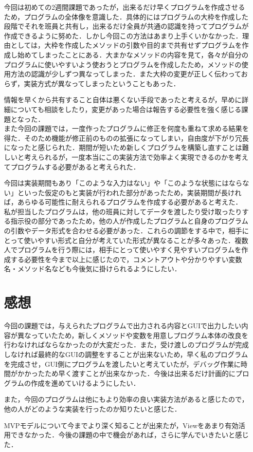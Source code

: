 \documentclass[12pt]{jarticle}
\begin{document}
今回は初めての2週間課題であったが，出来るだけ早くプログラムを作成させるため，プログラムの全体像を意識した．具体的にはプログラムの大枠を作成した段階でそれを班員と共有し，出来るだけ全員が共通の認識を持ってプログラムが作成できるように努めた．しかし今回この方法はあまり上手くいかなかった．理由としては，大枠を作成したメソッドの引数や目的まで共有せずプログラムを作成し始めてしまったことにある．大まかなメソッドの内容を見て，各々が自分のプログラムに使いやすいよう使おうとプログラムを作成したため，メソッドの使用方法の認識が少しずつ異なってしまった．また大枠の変更が正しく伝わっておらず，実装方式が異なってしまったということもあった．\par
情報を早くから共有すること自体は悪くない手段であったと考えるが，早めに詳細についても相談をしたり，変更があった場合は報告する必要性を強く感じる課題となった．\\

また今回の課題では，一度作ったプログラムに修正を何度も重ねて求める結果を得た．そのため機能が修正前のものの拡張になってしまい，自由度が下がり冗長になったと感じられた．期間が短いため新しくプログラムを構築し直すことは難しいと考えられるが，一度本当にこの実装方法で効率よく実現できるのかを考えてプログラムする必要があると考えられた．\par
今回は実装期間もあり「このような入力はない」や「このような状態にはならない」といった仮定のもと実装が行われた部分があったため，実装期間が長ければ，あらゆる可能性に耐えられるプログラムを作成する必要があると考えた．\\

私が担当したプログラムは，他の班員に対してデータを渡したり受け取ったりする指示役の部分であったため，他の人が作成したプログラムと自身のプログラムの引数やデータ形式を合わせる必要があった．これらの調節をする中で，相手にとって使いやすい形式と自分が考えていた形式が異なることが多々あった．複数人でプログラムを行う際には，相手にとって使いやすく見やすいプログラムを作成する必要性を今まで以上に感じたので，コメントアウトや分かりやすい変数名・メソッド名なども今後気に掛けられるようにしたい．\\

\section{感想}
今回の課題では，与えられたプログラムで出力される内容とGUIで出力したい内容が異なっていたため，新しくメソッドや変数を用意しプログラム本体の改良を行わなければならなかったのが大変だった．また，受け渡しのプログラムが完成しなければ最終的なGUIの調整をすることが出来ないため，早く私のプログラムを完成させ，GUI側にプログラムを渡したいと考えていたが，デバッグ作業に時間がかかったため早く渡すことが出来なかった．今後は出来るだけ計画的にプログラムの作成を進めていけるようにしたい．\par
また，今回のプログラムは他にもより効率の良い実装方法があると感じたので，他の人がどのような実装を行ったのか知りたいと感じた．\par
MVPモデルについて今までより深く知ることが出来たが，Viewをあまり有効活用できなかった．今後の課題の中で機会があれば，さらに学んでいきたいと感じた．
\end{document}
